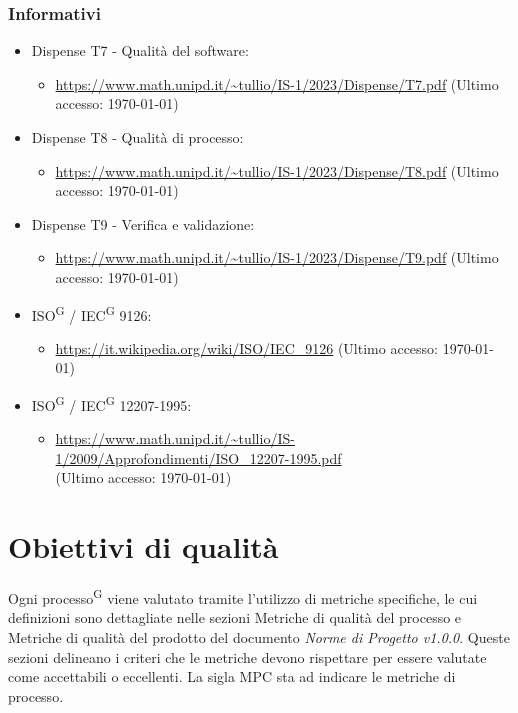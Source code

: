 \documentclass[8pt]{article}
\newcommand{\glossterm}[1]{#1\textsuperscript{G}} %
\begin{document}
\subsubsection{Informativi}
\begin{itemize}
	\item Dispense T7 - Qualità del software:
	\begin{itemize}
		\item \href{https://www.math.unipd.it/~tullio/IS-1/2023/Dispense/T7.pdf}{\color{myblue}https://www.math.unipd.it/\textasciitilde{}tullio/IS-1/2023/Dispense/T7.pdf} (Ultimo accesso: \today)
	\end{itemize}
	\item Dispense T8 - Qualità di processo:
	\begin{itemize}
		\item \href{https://www.math.unipd.it/~tullio/IS-1/2023/Dispense/T8.pdf}{\color{myblue}https://www.math.unipd.it/\textasciitilde{}tullio/IS-1/2023/Dispense/T8.pdf} (Ultimo accesso: \today)
	\end{itemize}
	\item Dispense T9 - Verifica e validazione:
	\begin{itemize}
		\item \href{https://www.math.unipd.it/~tullio/IS-1/2023/Dispense/T9.pdf}{\color{myblue}https://www.math.unipd.it/\textasciitilde{}tullio/IS-1/2023/Dispense/T9.pdf} (Ultimo accesso: \today)
	\end{itemize}
	\item \glossterm{ISO} / \glossterm{IEC} 9126:
	\begin{itemize}
		\item \href{https://it.wikipedia.org/wiki/ISO/IEC_9126}{\color{myblue}https://it.wikipedia.org/wiki/ISO/IEC\_9126} (Ultimo accesso: \today)
	\end{itemize}
	\item \glossterm{ISO} / \glossterm{IEC} 12207-1995:
	\begin{itemize}
		\item \href{https://www.math.unipd.it/~tullio/IS-1/2009/Approfondimenti/ISO_12207-1995.pdf}{\color{myblue}https://www.math.unipd.it/\textasciitilde{}tullio/IS-1/2009/Approfondimenti/ISO\_12207-1995.pdf} \\ (Ultimo accesso: \today)
	\end{itemize}
\end{itemize}
\clearpage
\section{Obiettivi di qualità}
Ogni \glossterm{processo} viene valutato tramite l'utilizzo di metriche specifiche, le cui definizioni sono dettagliate nelle sezioni Metriche di qualità del processo e Metriche di qualità del prodotto del documento \textit{Norme di Progetto v1.0.0}. Queste sezioni delineano i criteri che le metriche devono rispettare per essere valutate come accettabili o eccellenti. La sigla MPC sta ad indicare le metriche di processo.
\end{document}
